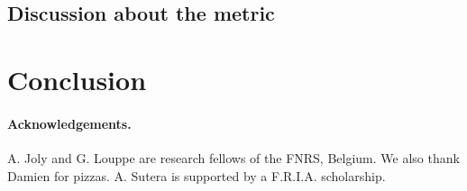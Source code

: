 \documentclass[wcp]{jmlr}
\begin{document}
\subsection{Discussion about the metric}
\label{sec:metric}


\section{Conclusion}


\begin{scriptsize}

\paragraph{Acknowledgements.} A. Joly and G. Louppe are research fellows of
the FNRS, Belgium. We also thank Damien for pizzas.  A. Sutera is supported by
a F.R.I.A. scholarship.

\end{scriptsize}


\end{document}
